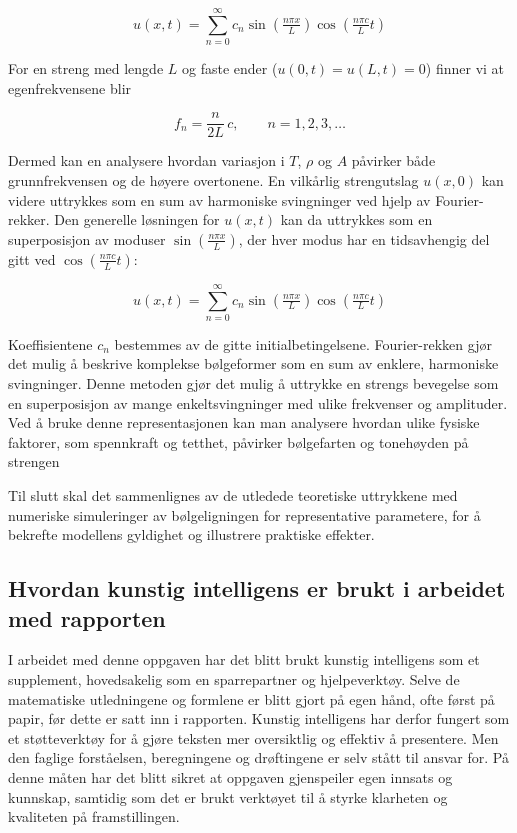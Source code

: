 \begin{equation*}
    u(x,t) = \sum_{n=0}^{\infty} c_n 
    \sin\!\left(\tfrac{n\pi x}{L}\right)
    \cos\!\left(\tfrac{n\pi c}{L}t\right)
\end{equation*}

For en streng med lengde $L$ og faste ender ($u(0,t)=u(L,t)=0$) finner vi at egenfrekvensene blir

\begin{equation*}
  f_n = \frac{n}{2L}\,c, \qquad n=1,2,3,\dots \label{egenfrekvensene}
\end{equation*}

Dermed kan en analysere hvordan variasjon i $T$, $\rho$ og $A$ påvirker både grunnfrekvensen og de høyere overtonene.  
En vilkårlig strengutslag $u(x,0)$ kan videre uttrykkes som en sum av harmoniske svingninger ved hjelp av Fourier-rekker.  
Den generelle løsningen for $u(x,t)$ kan da uttrykkes som en superposisjon av moduser 
$\sin\!\left(\tfrac{n\pi x}{L}\right)$, der hver modus har en tidsavhengig del gitt ved 
$\cos\!\left(\tfrac{n\pi c}{L}t\right)$:

\begin{equation*}
    u(x,t) = \sum_{n=0}^{\infty} c_n 
    \sin\!\left(\tfrac{n\pi x}{L}\right)
    \cos\!\left(\tfrac{n\pi c}{L}t\right)
\end{equation*}

Koeffisientene $c_n$ bestemmes av de gitte initialbetingelsene.  
Fourier-rekken gjør det mulig å beskrive komplekse bølgeformer som en sum av enklere, harmoniske svingninger.  
Denne metoden gjør det mulig å uttrykke en strengs bevegelse som en superposisjon av mange enkeltsvingninger med ulike frekvenser og amplituder.  
Ved å bruke denne representasjonen kan man analysere hvordan ulike fysiske faktorer, som spennkraft og tetthet, påvirker bølgefarten og tonehøyden på strengen \parencite{libretextsWave}

Til slutt skal det sammenlignes av de utledede teoretiske uttrykkene med numeriske simuleringer 
av bølgeligningen for representative parametere, for å bekrefte modellens gyldighet og illustrere praktiske effekter.

\subsection{Hvordan kunstig intelligens er brukt i arbeidet med rapporten}
I arbeidet med denne oppgaven har det blitt brukt kunstig intelligens som et supplement, hovedsakelig som en sparrepartner og hjelpeverktøy.
Selve de matematiske utledningene og formlene er blitt gjort på egen hånd, ofte først på papir, før dette er satt inn i rapporten. 
Kunstig intelligens har derfor fungert som et støtteverktøy for å gjøre teksten mer oversiktlig og effektiv å presentere. Men den faglige forståelsen, beregningene og drøftingene 
er selv stått til ansvar for. På denne måten har det blitt sikret at oppgaven gjenspeiler egen innsats og kunnskap, samtidig som det er brukt 
verktøyet til å styrke klarheten og kvaliteten på framstillingen.